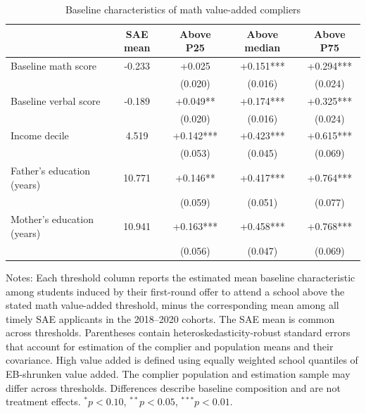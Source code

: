\begin{table}[!htbp]
\centering
\caption{Baseline characteristics of math value-added compliers}
\label{tab:math-va-complier-ses}
\begin{threeparttable}
\small
\setlength{\tabcolsep}{4pt}
\begin{tabular}{lcccc}
\toprule
 & SAE mean & Above P25 & Above median & Above P75 \\
\midrule
Baseline math score & -0.233 & +0.025 & +0.151*** & +0.294*** \\
 &  & (0.020) & (0.016) & (0.024) \\
Baseline verbal score & -0.189 & +0.049** & +0.174*** & +0.325*** \\
 &  & (0.020) & (0.016) & (0.024) \\
Income decile & 4.519 & +0.142*** & +0.423*** & +0.615*** \\
 &  & (0.053) & (0.045) & (0.069) \\
Father's education (years) & 10.771 & +0.146** & +0.417*** & +0.764*** \\
 &  & (0.059) & (0.051) & (0.077) \\
Mother's education (years) & 10.941 & +0.163*** & +0.458*** & +0.768*** \\
 &  & (0.056) & (0.047) & (0.069) \\
\bottomrule
\end{tabular}
\begin{tablenotes}[flushleft]
\footnotesize
\item Notes: Each threshold column reports the estimated mean baseline characteristic among students induced by their first-round offer to attend a school above the stated math value-added threshold, minus the corresponding mean among all timely SAE applicants in the 2018--2020 cohorts. The SAE mean is common across thresholds. Parentheses contain heteroskedasticity-robust standard errors that account for estimation of the complier and population means and their covariance. High value added is defined using equally weighted school quantiles of EB-shrunken value added. The complier population and estimation sample may differ across thresholds. Differences describe baseline composition and are not treatment effects. $^{*}p<0.10$, $^{**}p<0.05$, $^{***}p<0.01$.
\end{tablenotes}
\end{threeparttable}
\end{table}
